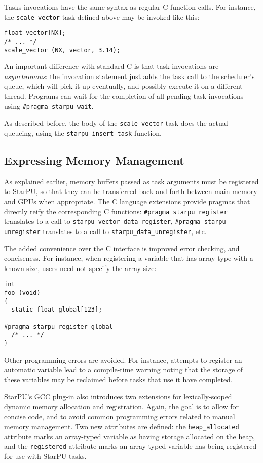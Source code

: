 \documentclass[twoside, a4paper, 10pt]{article}
\begin{document}
Tasks invocations have the same syntax as regular C function calls.  For
instance, the \texttt{scale\_vector} task defined above may be invoked like
this:


\begin{verbatim}
float vector[NX];
/* ... */
scale_vector (NX, vector, 3.14);
\end{verbatim}

An important difference with standard C is that task invocations are
\emph{asynchronous}: the invocation statement just adds the task call to the
scheduler's queue, which will pick it up eventually, and possibly
execute it on a different thread.  Programs can wait for the completion
of all pending task invocations using \texttt{\#pragma starpu wait}.

As described before, the body of the \texttt{scale\_vector} task does the actual
queueing, using the \texttt{starpu\_insert\_task} function.
\subsection{Expressing Memory Management}
\label{sec-3-4}


As explained earlier, memory buffers passed as task arguments must be
registered to StarPU, so that they can be transferred back and forth
between main memory and GPUs when appropriate.  The C language
extensions provide pragmas that directly reify the corresponding C
functions: \texttt{\#pragma starpu register} translates to a call to
\texttt{starpu\_vector\_data\_register}, \texttt{\#pragma starpu unregister} translates to
a call to \texttt{starpu\_data\_unregister}, etc.

The added convenience over the C interface is improved error checking,
and conciseness.  For instance, when registering a variable that has
array type with a known size, users need not specify the array size:


\begin{verbatim}
int
foo (void)
{
  static float global[123];

#pragma starpu register global
  /* ... */
}
\end{verbatim}

Other programming errors are avoided.  For instance, attempts to
register an automatic variable lead to a compile-time warning noting
that the storage of these variables may be reclaimed before tasks that
use it have completed.

StarPU's GCC plug-in also introduces two extensions for lexically-scoped
dynamic memory allocation and registration.  Again, the goal is to allow
for concise code, and to avoid common programming errors related to
manual memory management.  Two new attributes are defined: the
\texttt{heap\_allocated} attribute marks an array-typed variable as having
storage allocated on the heap, and the \texttt{registered} attribute marks an
array-typed variable has being registered for use with StarPU tasks.
\end{document}
